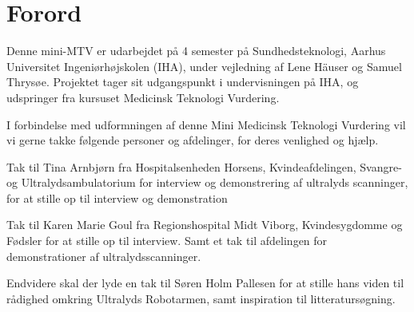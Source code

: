 \chapter{Forord}
Denne mini-MTV er udarbejdet på 4 semester på Sundhedsteknologi, Aarhus Universitet Ingeniørhøjskolen (IHA), under vejledning af Lene Häuser og Samuel Thrysøe. Projektet tager sit udgangspunkt i undervisningen på IHA, og udspringer fra kursuset Medicinsk Teknologi Vurdering. 


I forbindelse med udformningen af denne Mini Medicinsk Teknologi Vurdering vil vi gerne takke følgende personer og afdelinger, for deres venlighed og hjælp.


Tak til Tina Arnbjørn fra Hospitalsenheden Horsens, Kvindeafdelingen, Svangre- og Ultralydsambulatorium for interview og demonstrering af ultralyds scanninger, for at stille op til interview og demonstration 


Tak til Karen Marie Goul fra Regionshospital Midt Viborg, Kvindesygdomme og Fødsler for at stille op til interview. Samt et tak til afdelingen for demonstrationer af ultralydsscanninger. 


Endvidere skal der lyde en tak til Søren Holm Pallesen for at stille hans viden til rådighed omkring Ultralyds Robotarmen, samt inspiration til litteratursøgning. 

